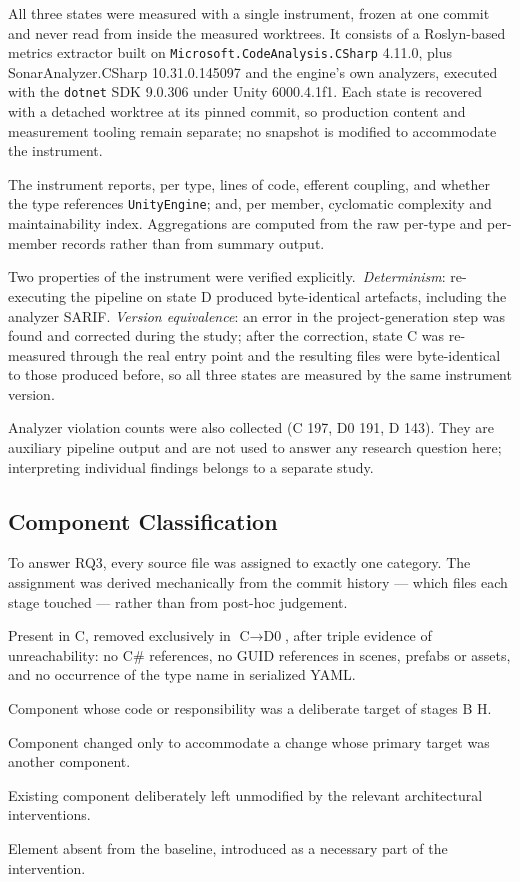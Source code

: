 \documentclass{sbc2019}%
\begin{document}
All three states were measured with a single instrument, frozen at one commit
and never read from inside the measured worktrees. It consists of a Roslyn-based
metrics extractor built on \texttt{Microsoft.CodeAnalysis.CSharp} 4.11.0, plus
SonarAnalyzer.CSharp 10.31.0.145097 and the engine's own analyzers, executed with
the \texttt{dotnet} SDK 9.0.306 under Unity 6000.4.1f1. Each state is recovered with a detached
worktree at its pinned commit, so production content and measurement tooling
remain separate; no snapshot is modified to accommodate the instrument.

The instrument reports, per type, lines of code, efferent coupling, and whether
the type references \texttt{UnityEngine}; and, per member, cyclomatic complexity
and maintainability index. Aggregations are computed from the raw per-type and
per-member records rather than from summary output.

Two properties of the instrument were verified explicitly.\ \emph{Determinism}:
re-executing the pipeline on state D produced byte-identical artefacts,
including the analyzer SARIF\@. \emph{Version equivalence}: an error in the
project-generation step was found and corrected during the study; after the
correction, state C was re-measured through the real entry point and the
resulting files were byte-identical to those produced before, so all three
states are measured by the same instrument version.

Analyzer violation counts were also collected (C 197, D0 191, D 143). They are
auxiliary pipeline output and are not used to answer any research question here;
interpreting individual findings belongs to a separate study.

\subsection{Component Classification}

To answer RQ3, every source file was assigned to exactly one category. The
assignment was derived mechanically from the commit history --- which files each
stage touched --- rather than from post-hoc judgement.

\begin{description}\itemsep2pt
\item[DEAD CODE REMOVED] Present in C, removed exclusively in $\text{C}\rightarrow\text{D0}$,
after triple evidence of unreachability: no C\# references, no GUID references in
scenes, prefabs or assets, and no occurrence of the type name in serialized YAML\@.
\item[DIRECTLY REFACTORED] Component whose code or responsibility was a deliberate
target of stages B\textendash{} H.
\item[INDIRECTLY AFFECTED] Component changed only to accommodate a change whose
primary target was another component.
\item[PRESERVED] Existing component deliberately left unmodified by the relevant
architectural interventions.
\item[NEW INTERVENTION ARTIFACT] Element absent from the baseline, introduced as a
necessary part of the intervention.
\end{description}
\end{document}

